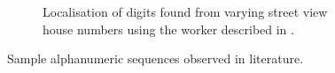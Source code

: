 \begin{figure}[h!]
\begin{subfigure}[b]{0.4\textwidth}
    \caption{\footnotesize Localisation of digits found from varying street view house numbers using the worker described in \citet{Netzer:2011to}.}
  \end{subfigure} 
  \caption[Alphanumeric sequences observed in literature]{Sample alphanumeric sequences observed in literature.}
  \label{fig:sample_sequences}
\end{figure}

\clearpage